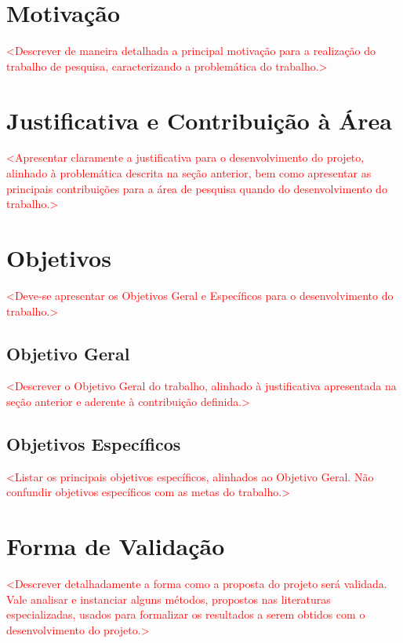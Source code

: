 \documentclass[
	12pt,				%
	openright,			%
	oneside,			%
	a4paper,			%
	chapter=TITLE,		%
	english,			%
	french,				%
	spanish,			%
	brazil				%
	]{abntex2}
\begin{document}
\chapter{Motivação}
\label{cap:motivacao}

\textcolor{red}{<Descrever de maneira detalhada a principal motivação para a realização do trabalho de pesquisa, caracterizando a problemática do trabalho.>}

\chapter{Justificativa e Contribuição à Área}
\label{cap:justificativa}

\textcolor{red}{<Apresentar claramente a justificativa para o desenvolvimento do projeto, alinhado à problemática descrita na seção anterior, bem como apresentar as principais contribuições para a área de pesquisa quando do desenvolvimento do trabalho.>}

\chapter{Objetivos}
\label{cap:objetivos}

\textcolor{red}{<Deve-se apresentar os Objetivos Geral e Específicos para o desenvolvimento do trabalho.>}

\section{Objetivo Geral}

\textcolor{red}{<Descrever o Objetivo Geral do trabalho, alinhado à justificativa apresentada na seção anterior e aderente à contribuição definida.>}

\section{Objetivos Específicos}

\textcolor{red}{<Listar os principais objetivos específicos, alinhados ao Objetivo Geral. Não confundir objetivos específicos com as metas do trabalho.>}

\chapter{Forma de Validação}
\label{cap:validacao}

\textcolor{red}{<Descrever detalhadamente a forma como a proposta do projeto será validada. Vale analisar e instanciar alguns métodos, propostos nas literaturas especializadas, usados para formalizar os resultados a serem obtidos com o desenvolvimento do projeto.>}
\end{document}
